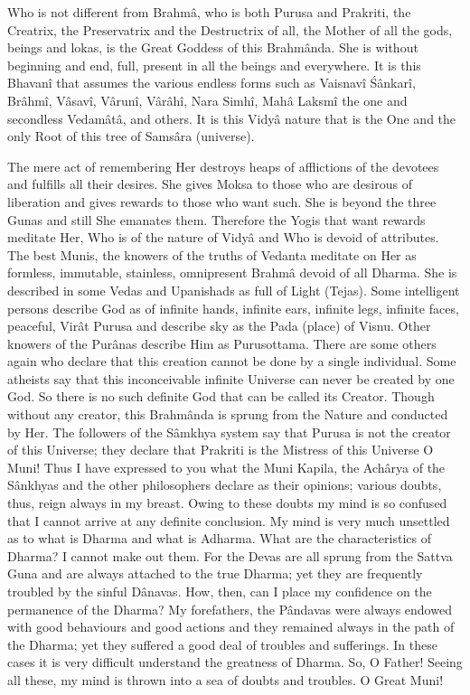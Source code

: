 Who is not different from Brahm\^a, who is both Purusa and Prakriti, the Creatrix, the Preservatrix and the Destructrix of all, the Mother of all the gods, beings and lokas, is the Great Goddess of this Brahm\^anda. She is without beginning and end, full, present in all the beings and everywhere. It is this Bhavan\^i that assumes the various endless forms such as Vaisnav\^i \'S\^ankar\^i, Br\^ahm\^i, V\^asav\^i, V\^arun\^i, V\^ar\^ah\^i, Nara Simh\^i, Mah\^a Laksm\^i the one and secondless Vedam\^at\^a, and others. It is this Vidy\^a nature that is the One and the only Root of this tree of Sams\^ara (universe).

The mere act of remembering Her destroys heaps of afflictions of the devotees and fulfills all their desires. She gives Moksa to those who are desirous of liberation and gives rewards to those who want such. She is beyond the three Gunas and still She emanates them. Therefore the Yogis that want rewards meditate Her, Who is of the nature of Vidy\^a and Who is devoid of attributes. The best Munis, the knowers of the truths of Vedanta meditate on Her as formless, immutable, stainless, omnipresent Brahm\^a devoid of all Dharma. She is described in some Vedas and Upanishads as full of Light (Tejas). Some intelligent persons describe God as of infinite hands, infinite ears, infinite legs, infinite faces, peaceful, Vir\^at Purusa and describe sky as the Pada (place) of Visnu. Other knowers of the Pur\^anas describe Him as Purusottama. There are some others again who declare that this creation cannot be done by a single individual. Some atheists say that this inconceivable infinite Universe can never be created by one God. So there is no such definite God that can be called its Creator. Though without any creator, this Brahm\^anda is sprung from the Nature and conducted by Her. The followers of the S\^amkhya system say that Purusa is not the creator of this Universe; they declare that Prakriti is the Mistress of this Universe O Muni! Thus I have expressed to you what the Muni Kapila, the Ach\^arya of the S\^ankhyas and the other philosophers declare as their opinions; various doubts, thus, reign always in my breast. Owing to these doubts my mind is so confused that I cannot arrive at any definite conclusion. My mind is very much unsettled as to what is Dharma and what is Adharma. What are the characteristics of Dharma? I cannot make out them. For the Devas are all sprung from the Sattva Guna and are always attached to the true Dharma; yet they are frequently troubled by the sinful D\^anavas. How, then, can I place my confidence on the permanence of the Dharma? My forefathers, the P\^andavas were always endowed with good behaviours and good actions and they remained always in the path of the Dharma; yet they suffered a good deal of troubles and sufferings. In these cases it is very difficult understand the greatness of Dharma. So, O Father! Seeing all these, my mind is thrown into a sea of doubts and troubles. O Great Muni!


